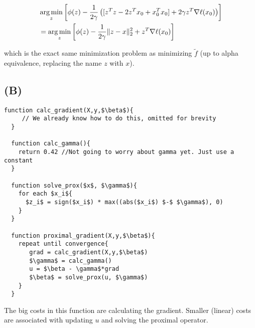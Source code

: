 \documentclass{article}
\DeclarePairedDelimiter\norm{\lVert}{\rVert}
\DeclareMathOperator*{\argmin}{arg\,min}
\begin{document}
\begin{align*}
    &\argmin_z \left[ \phi(z) - \frac{1}{2\gamma} \left(  [z^Tz - 2z^Tx_0 + x_0^Tx_0]  + 2\gamma z^T \nabla \ell(x_0)
                \right)  \right]\\
    &= \argmin_z \left[ \phi(z) - \frac{1}{2\gamma} \norm{z-x}_2^2  + z^T \nabla \ell(x_0) \right]
\end{align*}

which is the exact same minimization problem as minimizing $\widetilde{f}$ (up
to alpha equivalence, replacing the name $z$ with $x$).

\subsection*{(B)}

\begin{lstlisting}[mathescape=true]
  function calc_gradient(X,y,$\beta$){
     // We already know how to do this, omitted for brevity
  }

  function calc_gamma(){
    return 0.42 //Not going to worry about gamma yet. Just use a constant
  }

  function solve_prox($x$, $\gamma$){
    for each $x_i${
      $z_i$ = sign($x_i$) * max((abs($x_i$) $-$ $\gamma$), 0)
    }
  }

  function proximal_gradient(X,y,$\beta$){
    repeat until convergence{
       grad = calc_gradient(X,y,$\beta$)
       $\gamma$ = calc_gamma()
       u = $\beta - \gamma$*grad
       $\beta$ = solve_prox(u, $\gamma$)
    }
  }
\end{lstlisting}

The big costs in this function are calculating the gradient. Smaller (linear) costs are
associated with updating $u$ and solving the proximal operator.
\end{document}

